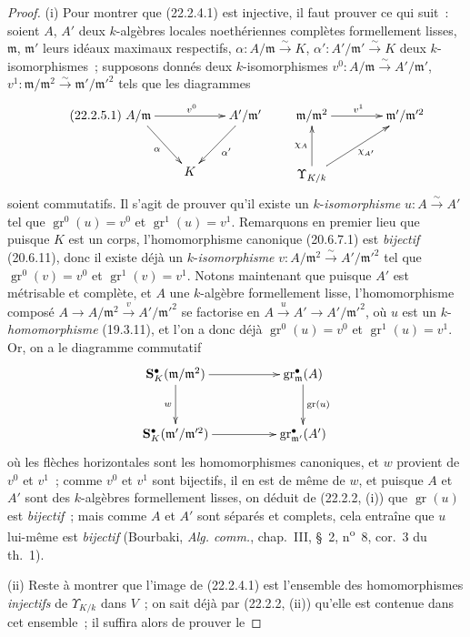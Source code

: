 \begin{proof}
(i) Pour montrer que (22.2.4.1) est injective, il faut prouver ce qui suit~:
soient $A$, $A'$ deux $k$-algèbres locales noethériennes complètes
formellement lisses, $\mathfrak m$, $\mathfrak m'$ leurs idéaux maximaux
respectifs, $\alpha:A/\mathfrak m\xrightarrow{\sim}K$,
$\alpha':A'/\mathfrak m'\xrightarrow{\sim}K$ deux $k$-isomorphismes~;
supposons donnés deux $k$-isomorphismes
$v^0:A/\mathfrak m\xrightarrow{\sim}A'/\mathfrak m'$,
$v^1:\mathfrak m/\mathfrak m^2\xrightarrow{\sim}\mathfrak m'/\mathfrak m'^2$
tels que les diagrammes
\begin{equation}
\tag{22.2.5.1}
\label{0.22.2.5.1-fr}
\xymatrix@C=2em@R=3em{
  A/\mathfrak m \ar[rr]^{v^0} \ar[dr]_{\alpha} & &
  A'/\mathfrak m' \ar[dl]^{\alpha'} \\
  & K &
}
\qquad
\xymatrix@C=4em@R=3em{
  \mathfrak m/\mathfrak m^2 \ar[r]^{v^1} &
  \mathfrak m'/\mathfrak m'^2 \\
  \Upsilon_{K/k} \ar[u]^{\chi_A} \ar[ur]_{\chi_{A'}} &
}
\end{equation}
soient commutatifs. Il s'agit de prouver qu'il existe un $k$-\emph{isomorphisme}
$u:A\xrightarrow{\sim}A'$ tel que $\operatorname{gr}^0(u)=v^0$ et
$\operatorname{gr}^1(u)=v^1$. Remarquons en premier lieu que puisque $K$ est
un corps, l'homomorphisme canonique (20.6.7.1) est \emph{bijectif} (20.6.11),
donc il existe déjà un $k$-\emph{isomorphisme}
$v:A/\mathfrak m^2\xrightarrow{\sim}A'/\mathfrak m'^2$ tel que
$\operatorname{gr}^0(v)=v^0$ et $\operatorname{gr}^1(v)=v^1$. Notons
maintenant que puisque $A'$ est métrisable et complète, et $A$ une
$k$-algèbre formellement lisse, l'homomorphisme composé
$A\to A/\mathfrak m^2\xrightarrow{v}A'/\mathfrak m'^2$ se factorise en
$A\xrightarrow{u}A'\to A'/\mathfrak m'^2$, où $u$ est
un $k$-\emph{homomorphisme} (19.3.11), et l'on a donc déjà
$\operatorname{gr}^0(u)=v^0$ et $\operatorname{gr}^1(u)=v^1$. Or, on a le
diagramme commutatif
\[
\xymatrix@C=5em@R=3em{
  \mathbf S_K^\bullet(\mathfrak m/\mathfrak m^2) \ar[r] \ar[d]_{w} &
  \operatorname{gr}_{\mathfrak m}^\bullet(A) \ar[d]^{\operatorname{gr}(u)} \\
  \mathbf S_K^\bullet(\mathfrak m'/\mathfrak m'^2) \ar[r] &
  \operatorname{gr}_{\mathfrak m'}^\bullet(A')
}
\]
où les flèches horizontales sont les homomorphismes canoniques, et $w$
provient de $v^0$ et $v^1$~; comme $v^0$ et $v^1$ sont bijectifs, il en est
de même de $w$, et puisque $A$ et $A'$ sont des $k$-algèbres formellement
lisses, on déduit de (22.2.2, (i)) que $\operatorname{gr}(u)$ est \emph{bijectif}~;
mais comme $A$ et $A'$ sont séparés et complets, cela entraîne que $u$
lui-même est \emph{bijectif} (Bourbaki, \emph{Alg. comm.}, chap.~III, §~2,
n\textsuperscript{o}~8, cor.~3 du th.~1).

(ii) Reste à montrer que l'image de (22.2.4.1) est l'ensemble des
homomorphismes \emph{injectifs} de $\Upsilon_{K/k}$ dans $V$~; on sait déjà
par (22.2.2, (ii)) qu'elle est contenue dans cet ensemble~; il suffira alors
de prouver le
\end{proof}

